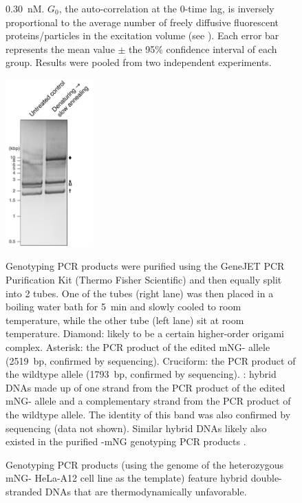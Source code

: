 \begin{figure}
\SI{0.30}{nM}. $G_0$, the auto-correlation at the 0-time lag, is inversely proportional to the average number of freely diffusive fluorescent proteins/particles in the excitation volume (see ). Each error bar represents the mean value $\pm$ the 95\% confidence interval of each group. Results were pooled from two independent experiments.
\end{figure}

\begin{figure}
    \centering
    \includegraphics[width=0.3\textwidth]{chapters/figures/HybridGenotypingdsDNA.pdf}
    \caption{Genotyping PCR products (using the genome of the heterozygous mNG- HeLa-A12 cell line as the template) feature hybrid double-stranded DNAs that are thermodynamically unfavorable.}
    \noindent\justifying Genotyping PCR products were purified using the GeneJET PCR Purification Kit (Thermo Fisher Scientific) and then equally split into 2 tubes. One of the tubes (right lane) was then placed in a boiling water bath for \SI{5}{min} and slowly cooled to room temperature, while the other tube (left lane) sit at room temperature. Diamond: likely to be a certain higher-order origami complex. Asterisk: the PCR product of the edited mNG- allele (\SI{2519}{bp}, confirmed by sequencing). Cruciform: the PCR product of the wildtype  allele (\SI{1793}{bp}, confirmed by sequencing). \underline{\textOmega{}}: hybrid DNAs made up of one strand from the PCR product of the edited mNG- allele and a complementary strand from the PCR product of the wildtype  allele. The identity of this band was also confirmed by sequencing (data not shown). Similar hybrid DNAs likely also existed in the purified -mNG genotyping PCR products .
    \label{HybridGenotypingdsDNA}
\end{figure}

